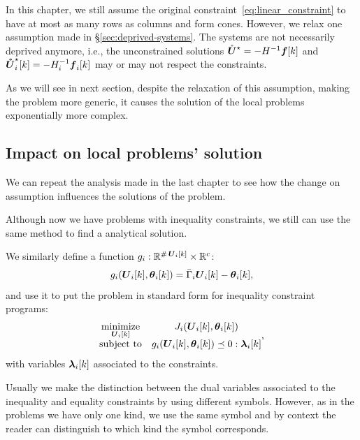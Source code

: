 \documentclass[../main.tex]{subfiles}
\begin{document}
In this chapter, we still assume the original constraint~\eqref{eq:linear_constraint} to have at most as many rows as columns and form cones.
However, we relax one assumption made in \S\ref{sec:deprived-systems}.
The systems are not necessarily deprived anymore, i.e., the unconstrained solutions
${\mathring{\boldsymbol{U}}^{\star}}=-H^{-1}\boldsymbol{f}[k]$ and $\optuncUik=-H_{i}^{-1}\vec{f}_{i}[k]$ may or may not respect the constraints.

As we will see in next section, despite the relaxation of this assumption, making the problem more generic, it causes the solution of the local problems exponentially more complex.

\subsection{Impact on local problems' solution}\label{sec:impact-local-problem}
We can repeat the analysis made in the last chapter to see how the change on assumption influences the solutions of the problem.

Although now we have \qp{} problems with inequality constraints, we still can use the same method to find a analytical solution.

We similarly define a function $g_i:\mathbb{R}^{\operatorname{\#}\boldsymbol{U}_{i}[k]}\times \mathbb{R}^{c}$:
\begin{equation}
  \label{eq:lagrangian_inequality}
  \inequalityfunction=\bar{\Gamma}_{i}\vec{U}_i[k]-\thetaik,
\end{equation}
and use it to put the problem in standard form for inequality constraint \qp{} programs:
\begin{equation}
  \begin{matrix}
    \label{eq:local_problem_equality_standard_notation}
    \minimize\limits_{\vec{U}_{i}[k]}&\obji(\vec{U}_{i}[k],\thetaik)\\
    \mathrm{subject~ to} & \inequalityfunction\preceq 0:\lambdaik
  \end{matrix},
\end{equation}
with variables $\lambdaik$ associated to the constraints.
\begin{remark}
  Usually we make the distinction between the dual variables associated to the inequality and equality constraints by using different symbols.
  However, as in the problems we have only one kind, we use the same symbol and by context the reader can distinguish to which kind the symbol corresponds.
\end{remark}
\end{document}
